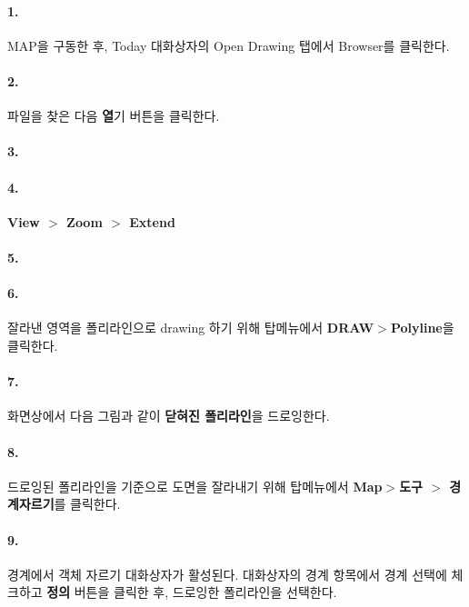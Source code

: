 \documentclass[12pt,a4paper,oneside]{book}
\begin{document}
	\paragraph {1.} 
	MAP을 구동한 후, Today 대화상자의 Open Drawing 탭에서 Browser를 클릭한다.
	
	\paragraph {2.} 
	파일을 찾은 다음 \textbf{열}기 버튼을 클릭한다.

	\paragraph {3.} 
		
	

	\paragraph {4.} 
	\textbf{View $>$ Zoom $>$ Extend}


	\paragraph {5.} 

						
	\paragraph {6.} 
	잘라낸 영역을 폴리라인으로 drawing 하기 위해 탑메뉴에서 \textbf{DRAW$>$Polyline}을 클릭한다.
	
	\paragraph {7.} 
	화면상에서 다음 그림과 같이 \textbf{닫혀진 폴리라인}을 드로잉한다.
	
	\paragraph {8.} 
	드로잉된 폴리라인을 기준으로 도면을 잘라내기 위해 탑메뉴에서 \textbf{Map$>$도구 $>$ 경계자르기}를 클릭한다.
	
	\paragraph {9.} 
	경계에서 객체 자르기 대화상자가 활성된다. 
	대화상자의 경계 항목에서 경계 선택에 체크하고 \textbf{정의} 버튼을 클릭한 후, 드로잉한 폴리라인을 선택한다.
	
\end{document}
